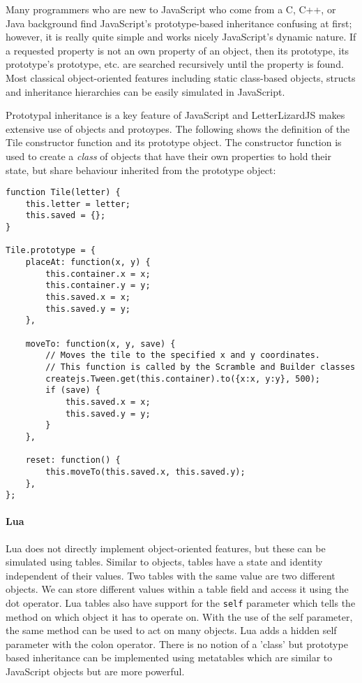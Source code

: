 Many programmers who are new to JavaScript who come from a
C, C++, or Java background find JavaScript's prototype-based inheritance
confusing at first; however, it is really quite simple and works nicely
JavaScript's dynamic nature. If a requested property is not an own property
of an object, then its prototype, its prototype's prototype, etc. are searched
recursively until the property is found. Most classical object-oriented features
including static class-based objects, structs and inheritance hierarchies can be
easily simulated in JavaScript. 

Prototypal inheritance is a key feature of JavaScript and LetterLizardJS makes
extensive use of objects and protoypes. The following shows the definition
of the Tile constructor function and its prototype object. The constructor function
is used to create a \emph{class} of objects that have their own properties to
hold their state, but share behaviour inherited from the prototype object:

\begin{lstlisting}[caption=A class definition in JavaScript]
function Tile(letter) {
	this.letter = letter;
	this.saved = {};
}

Tile.prototype = {
	placeAt: function(x, y) {
		this.container.x = x;
		this.container.y = y;
		this.saved.x = x;
		this.saved.y = y;
	},

	moveTo: function(x, y, save) {
		// Moves the tile to the specified x and y coordinates.
		// This function is called by the Scramble and Builder classes
		createjs.Tween.get(this.container).to({x:x, y:y}, 500);
		if (save) {
			this.saved.x = x;
			this.saved.y = y;
		}
	},

	reset: function() {
		this.moveTo(this.saved.x, this.saved.y);
	},
};
\end{lstlisting}

\paragraph{Lua}
Lua does not directly implement object-oriented features, but these can be simulated using tables. Similar to objects, tables have a state and identity independent of their values. Two tables with the same value are two different objects. We can store different values within a table field and access it using the dot operator. Lua tables also have support for the \texttt{self} parameter which tells the method on which object it has to operate on. With the use of the self parameter, the same method can be used to act on many objects. Lua adds a hidden self parameter with the colon operator. There is no notion of a 'class' but prototype based inheritance can be implemented using metatables which are similar to JavaScript objects but are more powerful. 
